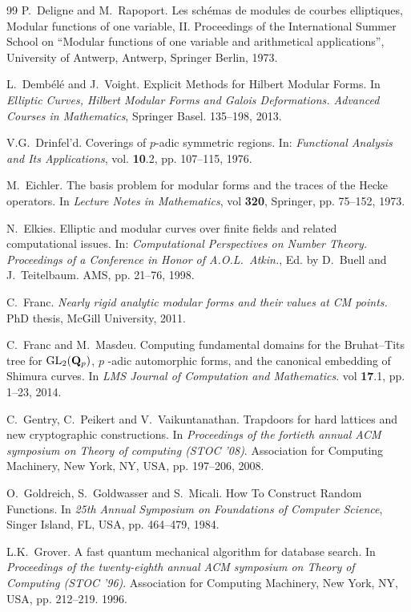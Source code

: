 \documentclass[10pt]{amsart}
\theoremstyle{theostyle}
\begin{document}
\begin{thebibliography}{99}
P.~Deligne and M.~Rapoport.
Les sch\'emas de modules de courbes elliptiques, Modular functions of one variable, II. Proceedings of the International Summer School on ``Modular functions of one variable and arithmetical applications'', University of Antwerp, Antwerp, Springer Berlin, 1973.

L.~Demb\'el\'e and J.~Voight. 
Explicit Methods for Hilbert Modular Forms. 
In {\it Elliptic Curves, Hilbert Modular Forms and Galois Deformations. Advanced Courses in Mathematics}, Springer Basel. 135--198, 2013.

V.G.~Drinfel'd. 
Coverings of $p$-adic symmetric regions. 
In: {\it Functional Analysis and Its Applications}, vol. {\bf 10}.2, pp. 107--115, 1976.

M.~Eichler.
The basis problem for modular forms and the traces of the Hecke operators.
In {\it Lecture Notes in Mathematics}, vol {\bf 320}, Springer, pp. 75--152, 1973.

N.~Elkies. 
Elliptic and modular curves over finite fields and related computational issues. 
In: {\it Computational Perspectives on Number Theory. Proceedings of a Conference in
	Honor of A.O.L.~Atkin.}, Ed. by D.~Buell and J.~Teitelbaum. AMS, pp. 21--76, 1998.

C.~Franc.
{\it Nearly rigid analytic modular forms and their values at CM points.}
PhD thesis, McGill University, 2011.

C.~Franc and M.~Masdeu.
Computing fundamental domains for the Bruhat–Tits tree for ${\rm GL}_2(\mathbf{Q}_p)$, $p$ -adic automorphic forms, and the canonical embedding of Shimura curves. 
In {\it LMS Journal of Computation and Mathematics}. vol {\bf17}.1, pp. 1--23, 2014.

C.~Gentry, C.~Peikert and V.~Vaikuntanathan.
Trapdoors for hard lattices and new cryptographic constructions. 
In {\it Proceedings of the fortieth annual ACM symposium on Theory of computing (STOC '08)}. Association for Computing Machinery, New York, NY, USA, pp. 197--206, 2008.

O.~Goldreich, S.~Goldwasser and S.~Micali.
How To Construct Random Functions.
In {\it 25th Annual Symposium on Foundations of Computer Science}, Singer Island, FL, USA, pp. 464--479, 1984.

L.K.~Grover. 
A fast quantum mechanical algorithm for database search. 
In {\it Proceedings of the twenty-eighth annual ACM symposium on Theory of Computing (STOC '96)}. 
Association for Computing Machinery, New York, NY, USA, pp. 212--219. 1996.


\end{thebibliography}
\end{document}
